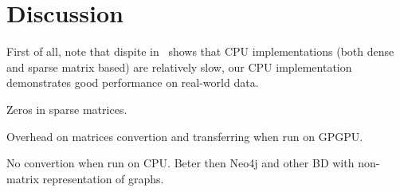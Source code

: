 \section{Discussion}

First of all, note that dispite in~\cite{in:2019:ECP:3327964.3328503} shows that CPU implementations (both dense and sparse matrix based) are relatively slow, our CPU implementation demonstrates good performance on real-world data.

Zeros in sparse matrices.

Overhead on matrices convertion and transferring when run on GPGPU.

No convertion when run on CPU. Beter then Neo4j and other BD with non-matrix representation of graphs.

